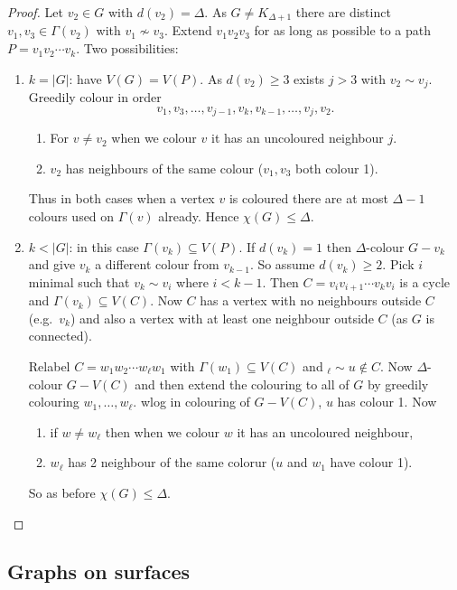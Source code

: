 \documentclass[a4paper]{article}
\begin{document}
\begin{proof}
  Let \(v_2 \in G\) with \(d(v_2) = \Delta\). As \(G \neq K_{\Delta + 1}\) there are distinct \(v_1, v_3 \in \Gamma(v_2)\) with \(v_1 \nsim v_3\). Extend \(v_1v_2v_3\) for as long as possible to a path \(P = v_1v_2 \cdots v_k\). Two possibilities:
  \begin{enumerate}
  \item \(k = |G|\): have \(V(G) = V(P)\). As \(d(v_2) \geq 3\) exists \(j > 3\) with \(v_2 \sim v_j\). Greedily colour in order
    \[
      v_1, v_3, \dots, v_{j - 1}, v_k, v_{k - 1}, \dots, v_j, v_2.
    \]
    \begin{enumerate}
    \item For \(v \neq v_2\) when we colour \(v\) it has an uncoloured neighbour \(j\).
    \item \(v_2\) has neighbours of the same colour (\(v_1, v_3\) both colour 1).
    \end{enumerate}
    Thus in both cases when a vertex \(v\) is coloured there are at most \(\Delta - 1\) colours used on \(\Gamma(v)\) already. Hence \(\chi(G) \leq \Delta\).
  \item \(k < |G|\): in this case \(\Gamma(v_k) \subseteq V(P)\). If \(d(v_k) = 1\) then \(\Delta\)-colour \(G - v_k\) and give \(v_k\) a different colour from \(v_{k - 1}\). So assume \(d(v_k) \geq 2\). Pick \(i\) minimal such that \(v_k \sim v_i\) where \(i < k - 1\). Then \(C = v_iv_{i + 1} \cdots v_kv_i\) is a cycle and \(\Gamma(v_k) \subseteq V(C)\). Now \(C\) has a vertex with no neighbours outside \(C\) (e.g.\ \(v_k\)) and also a vertex with at least one neighbour outside \(C\) (as \(G\) is connected).

    Relabel \(C = w_1w_2 \cdots w_\ell w_1\) with \(\Gamma(w_1) \subseteq V(C)\) and \(_\ell \sim u \notin C\). Now \(\Delta\)-colour \(G - V(C)\) and then extend the colouring to all of \(G\) by greedily colouring \(w_1, \dots, w_\ell\). wlog in colouring of \(G - V(C)\), \(u\) has colour 1. Now
    \begin{enumerate}
    \item if \(w \neq w_\ell\) then when we colour \(w\) it has an uncoloured neighbour,
    \item \(w_\ell\) has 2 neighbour of the same colorur (\(u\) and \(w_1\) have colour 1).
    \end{enumerate}
    So as before \(\chi(G) \leq \Delta\).
  \end{enumerate}
\end{proof}

\subsection{Graphs on surfaces}
\end{document}

